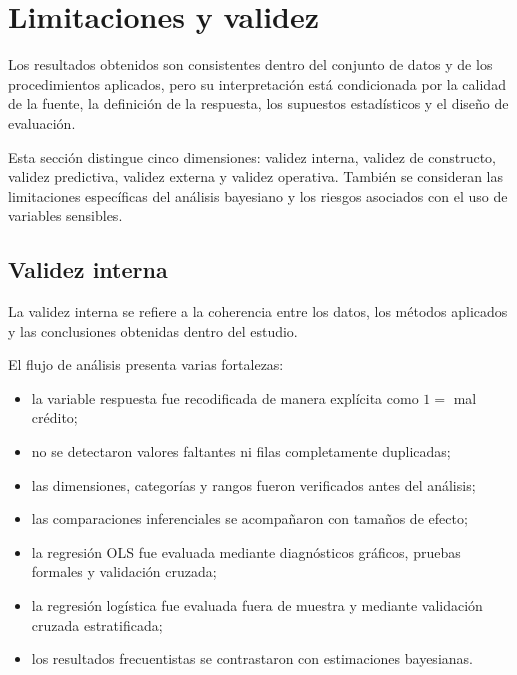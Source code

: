 \section{Limitaciones y validez}
\label{sec:limitaciones}

Los resultados obtenidos son consistentes dentro del conjunto de datos y
de los procedimientos aplicados, pero su interpretación está condicionada
por la calidad de la fuente, la definición de la respuesta, los supuestos
estadísticos y el diseño de evaluación.

Esta sección distingue cinco dimensiones: validez interna, validez de
constructo, validez predictiva, validez externa y validez operativa.
También se consideran las limitaciones específicas del análisis
bayesiano y los riesgos asociados con el uso de variables sensibles.

\subsection{Validez interna}

La validez interna se refiere a la coherencia entre los datos, los métodos
aplicados y las conclusiones obtenidas dentro del estudio.

El flujo de análisis presenta varias fortalezas:

\begin{itemize}
    \item la variable respuesta fue recodificada de manera explícita como
    \(1=\) mal crédito;

    \item no se detectaron valores faltantes ni filas completamente
    duplicadas;

    \item las dimensiones, categorías y rangos fueron verificados antes
    del análisis;

    \item las comparaciones inferenciales se acompañaron con tamaños de
    efecto;

    \item la regresión OLS fue evaluada mediante diagnósticos gráficos,
    pruebas formales y validación cruzada;

    \item la regresión logística fue evaluada fuera de muestra y mediante
    validación cruzada estratificada;

    \item los resultados frecuentistas se contrastaron con estimaciones
    bayesianas.
\end{itemize}

